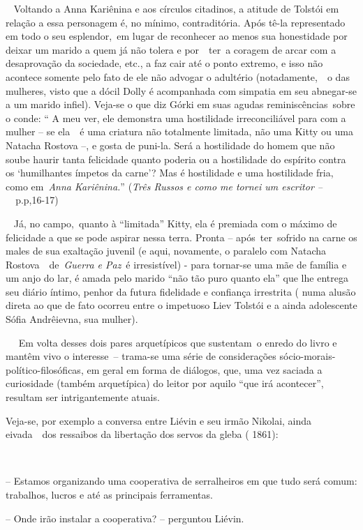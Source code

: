 ~ Voltando a Anna Kariênina e aos círculos citadinos, a atitude de
Tolstói em relação a essa personagem é, no mínimo, contraditória. Após
tê-la representado em todo o seu esplendor,~em lugar de reconhecer ao
menos sua honestidade por deixar um marido a quem já não tolera e
por~~ter~a coragem de arcar com a desaprovação da sociedade, etc., a faz
cair até o ponto extremo, e isso não acontece somente pelo fato de ele
não advogar o adultério (notadamente,~~o das mulheres, visto que a dócil
Dolly é acompanhada com simpatia em seu abnegar-se a um marido infiel).
Veja-se o que diz Górki em suas agudas reminiscências~sobre o conde: ``
A meu ver, ele demonstra uma hostilidade irreconciliável para com a
mulher -- se ela~~é uma criatura não totalmente limitada, não uma Kitty
ou uma Natacha Rostova --, e gosta de puni-la. Será a hostilidade do
homem que não soube haurir tanta felicidade quanto poderia ou a
hostilidade do espírito contra os `humilhantes ímpetos da carne'? Mas é
hostilidade e uma hostilidade fria, como em~\emph{Anna Kariênina.}''
(\emph{Três Russos e como me tornei um escritor --~}~p.p,16-17)

\emph{~} Já, no campo,~quanto à ``limitada'' Kitty, ela é premiada com o
máximo de felicidade a que se pode aspirar nessa terra. Pronta --
após~ter~sofrido na carne os males de sua exaltação juvenil (e aqui,
novamente, o paralelo com Natacha Rostova~~de~\emph{Guerra e Paz}~é
irresistível) - para tornar-se uma mãe de família e um anjo do lar, é
amada pelo marido ``não tão puro quanto ela'' que lhe entrega seu diário
íntimo, penhor da futura fidelidade e confiança irrestrita ( numa alusão
direta ao que de fato ocorreu entre o impetuoso Liev Tolstói e a ainda
adolescente Sófia Andrêievna, sua mulher).

~~ Em volta desses dois pares arquetípicos que sustentam~o enredo do
livro e mantêm vivo o interesse~-- trama-se uma série de considerações
sócio-morais-político-filosóficas, em geral em forma de diálogos, que,
uma vez saciada a curiosidade (também arquetípica) do leitor por aquilo
``que irá acontecer'', resultam ser intrigantemente atuais.

Veja-se, por exemplo a conversa entre Liévin e seu irmão Nikolai, ainda
eivada~~dos ressaibos da libertação dos servos da gleba ( 1861):

~

-- Estamos organizando uma cooperativa de serralheiros em que tudo será
comum: trabalhos, lucros e até as principais ferramentas.

-- Onde irão instalar a cooperativa? -- perguntou Liévin.

